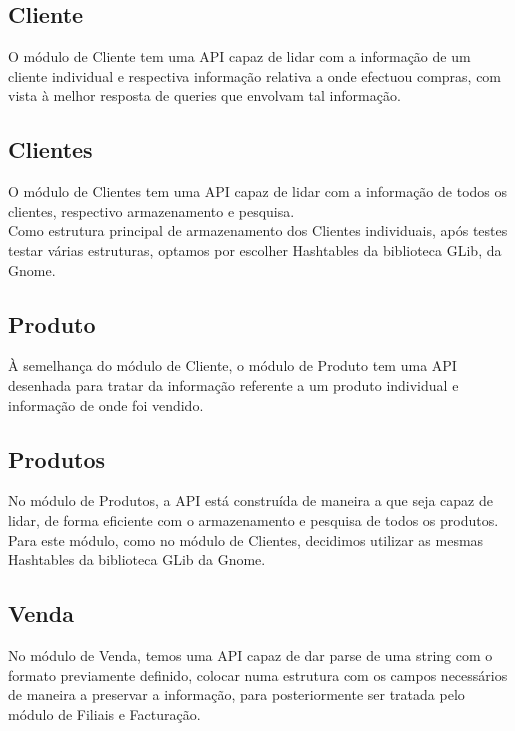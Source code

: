 \documentclass[a4paper]{report}
\begin{document}
\subsection{Cliente}

O módulo de Cliente tem uma API capaz de lidar com a informação de um cliente
individual e respectiva informação relativa a onde efectuou compras, com vista
à melhor resposta de queries que envolvam tal informação.

\subsection{Clientes}

O módulo de Clientes tem uma API capaz de lidar com a informação de todos os
clientes, respectivo armazenamento e pesquisa. \\ 
Como estrutura principal de armazenamento dos Clientes individuais, após testes 
testar várias estruturas, optamos por escolher Hashtables da biblioteca GLib, 
da Gnome.

\subsection{Produto}

À semelhança do módulo de Cliente, o módulo de Produto tem uma API desenhada
para tratar da informação referente a um produto individual e informação de 
onde foi vendido.

\subsection{Produtos}

No módulo de Produtos, a API está construída de maneira a que seja capaz de
lidar, de forma eficiente com o armazenamento e pesquisa de todos os produtos.\\
Para este módulo, como no módulo de Clientes, decidimos utilizar as mesmas Hashtables
da biblioteca GLib da Gnome.

\subsection{Venda}

No módulo de Venda, temos uma API capaz de dar parse de uma string com o formato 
previamente definido, colocar numa estrutura com os campos necessários de maneira
a preservar a informação, para posteriormente ser tratada pelo módulo de Filiais e
Facturação.
\end{document}

